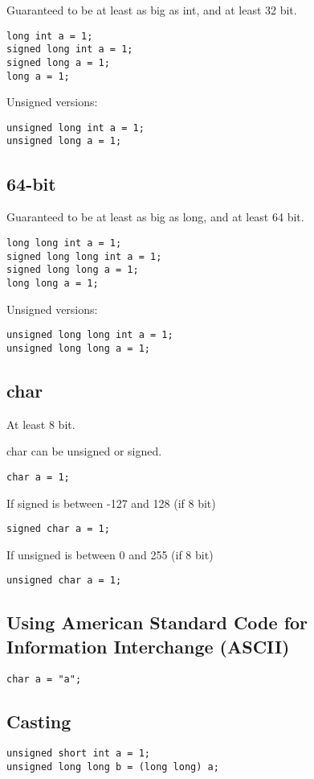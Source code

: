 Guaranteed to be at least as big as int, and at least 32 bit.

\begin{verbatim}
long int a = 1;
signed long int a = 1;
signed long a = 1;
long a = 1;
\end{verbatim}

Unsigned versions:

\begin{verbatim}
unsigned long int a = 1;
unsigned long a = 1;
\end{verbatim}


\subsection{64-bit}

Guaranteed to be at least as big as long, and at least 64 bit.

\begin{verbatim}
long long int a = 1;
signed long long int a = 1;
signed long long a = 1;
long long a = 1;
\end{verbatim}

Unsigned versions:

\begin{verbatim}
unsigned long long int a = 1;
unsigned long long a = 1;
\end{verbatim}

\subsection{char}

At least 8 bit.

char can be unsigned or signed.
\begin{verbatim}
char a = 1;
\end{verbatim}


If signed is between -127 and 128 (if 8 bit)
\begin{verbatim}
signed char a = 1;
\end{verbatim}

If unsigned is between 0 and 255 (if 8 bit)
\begin{verbatim}
unsigned char a = 1;
\end{verbatim}

\subsection{Using American Standard Code for Information Interchange (ASCII)}

\begin{verbatim}
char a = "a";
\end{verbatim}


\subsection{Casting}

\begin{verbatim}
unsigned short int a = 1;
unsigned long long b = (long long) a;
\end{verbatim}


